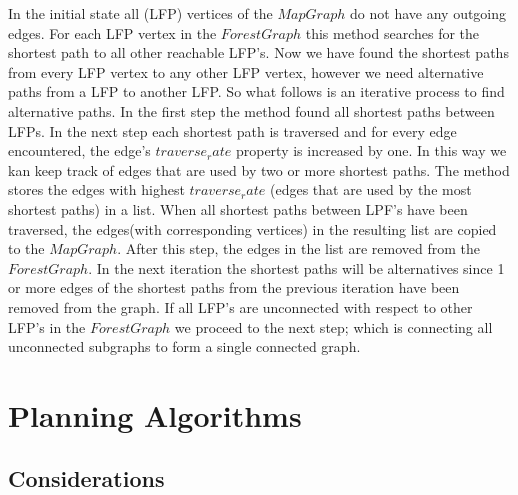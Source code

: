 In the initial state all (LFP) vertices of the $MapGraph$ do not have any outgoing edges. For each LFP vertex in the $ForestGraph$ this method searches for the shortest path to all other reachable LFP's. Now we have found the shortest paths from every LFP vertex to any other LFP vertex, however we need alternative paths from a LFP to another LFP. So what follows is an iterative process to find alternative paths. In the first step the method found all shortest paths between LFPs. 
In the next step each shortest path is traversed and for every edge encountered, the edge's $traverse_rate$ property is increased by one. In this way we kan keep track of edges that are used by two or more shortest paths. The method stores the edges with highest $traverse_rate$ (edges that are used by the most shortest paths) in a list. When all shortest paths between LPF's have been traversed, the edges(with corresponding vertices) in the resulting list are copied to the $MapGraph$. After this step, the edges in the list are removed from the $ForestGraph$. In the next iteration the shortest paths will be alternatives since 1 or more edges of the shortest paths from the previous iteration have been removed from the graph. If all LFP's are unconnected with respect to other LFP's in the $ForestGraph$ we proceed to the next step; which is connecting all unconnected subgraphs to form a single connected graph.       

         










% 
%
%
%
%

\chapter{Planning Algorithms}

\section{Considerations}

